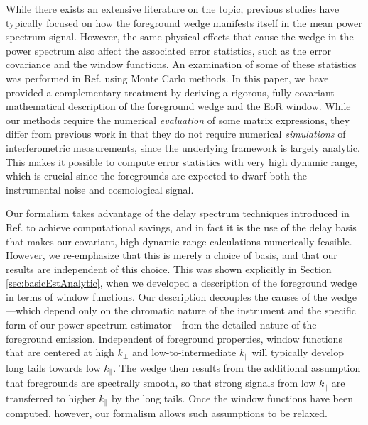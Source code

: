 \documentclass[twocolumn,aps,prd,nofootinbib,showpacs]{revtex4-1}
\begin{document}
While there exists an extensive literature on the topic, previous studies have typically focused on how the foreground wedge manifests itself in the mean power spectrum signal.  However, the same physical effects that cause the wedge in the power spectrum also affect the associated error statistics, such as the error covariance and the window functions.  An examination of some of these statistics was performed in Ref. \cite{Trott2012} using Monte Carlo methods.  In this paper, we have provided a complementary treatment by deriving a rigorous, fully-covariant mathematical description of the foreground wedge and the EoR window.  While our methods require the numerical \emph{evaluation} of some matrix expressions, they differ from previous work in that they do not require numerical \emph{simulations} of interferometric measurements, since the underlying framework is largely analytic.  This makes it possible to compute error statistics with very high dynamic range, which is crucial since the foregrounds are expected to dwarf both the instrumental noise and cosmological signal.

Our formalism takes advantage of the delay spectrum techniques introduced in Ref. \cite{Parsons2012b} to achieve computational savings, and in fact it is the use of the delay basis that makes our covariant, high dynamic range calculations numerically feasible.  However, we re-emphasize that this is merely a choice of basis, and that our results are independent of this choice.  This was shown explicitly in Section \ref{sec:basicEstAnalytic}, when we developed a description of the foreground wedge in terms of window functions.  Our description decouples the causes of the wedge---which depend only on the chromatic nature of the instrument and the specific form of our power spectrum estimator---from the detailed nature of the foreground emission.  Independent of foreground properties, window functions that are centered at high $k_\perp$ and low-to-intermediate $k_\parallel$ will typically develop long tails towards low $k_\parallel$.  The wedge then results from the additional assumption that foregrounds are spectrally smooth, so that strong signals from low $k_\parallel$ are transferred to higher $k_\parallel$ by the long tails.  Once the window functions have been computed, however, our formalism allows such assumptions to be relaxed.
\end{document}
